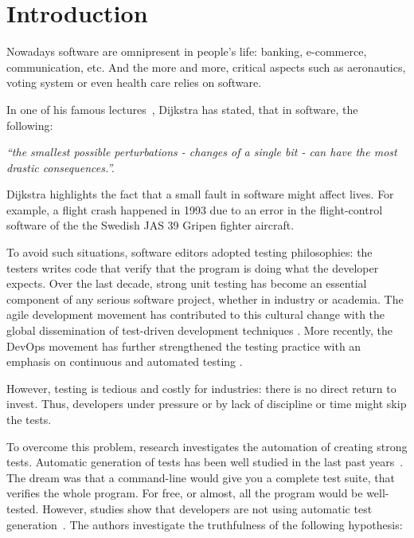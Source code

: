 \chapter{Introduction}
\label{chapt:introduction}

\minitoc

Nowadays software are omnipresent in people's life: banking, e-commerce, communication, etc. 
And the more and more, critical aspects such as aeronautics, voting system or even health care relies on software.

In one of his famous lectures~\cite{DijkstraLecture1989}, Dijkstra has stated, that in software, the following: 
\begin{center}
	\emph{``the smallest possible perturbations - \ie changes of a single bit - can have the most drastic consequences.''.}
\end{center}

Dijkstra highlights the fact that a small fault in software might affect lives.
For example, a flight crash happened in 1993 due to an error in the flight-control software of the the Swedish JAS 39 Gripen fighter aircraft.

To avoid such situations, software editors adopted testing philosophies: the testers writes code that verify that the program is doing what the developer expects.
Over the last decade, strong unit testing has become an essential component of any serious software project, whether in industry or academia.
The agile development movement has contributed to this cultural change with the global dissemination of test-driven development techniques \cite{beck2003test}.
More recently, the DevOps movement has further strengthened the testing practice with an emphasis on continuous and automated testing \cite{Roche2013Devops}.

However, testing is tedious and costly for industries: there is no direct return to invest.
Thus, developers under pressure or by lack of discipline or time might skip the tests.

To overcome this problem, research investigates the automation of creating strong tests.
Automatic generation of tests has been well studied in the last past years~\cite{ESECFSE11, PachecoE2005}.
The dream was that a command-line would give you a complete test suite, that verifies the whole program.
For free, or almost, all the program would be well-tested.
However, studies show that developers are not using automatic test generation~\cite{TOSEM_userstudy}.
The authors investigate the truthfulness of the following hypothesis:

